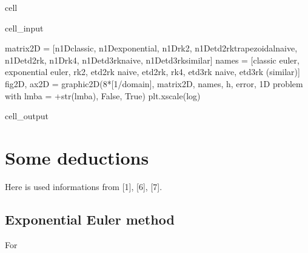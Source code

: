 \documentclass[letterpaper,10pt,english]{jupyterBook}
\begin{document}
\begin{sphinxuseclass}{cell}\begin{sphinxVerbatimInput}

\begin{sphinxuseclass}{cell_input}
\begin{sphinxVerbatim}[commandchars=\\\{\}]
matrix\PYGZus{}2D = [n\PYGZus{}1D\PYGZus{}classic, n\PYGZus{}1D\PYGZus{}exponential, n\PYGZus{}1D\PYGZus{}rk2, n\PYGZus{}1D\PYGZus{}etd2rk\PYGZus{}trapezoidal\PYGZus{}naive, n\PYGZus{}1D\PYGZus{}etd2rk, n\PYGZus{}1D\PYGZus{}rk4, n\PYGZus{}1D\PYGZus{}etd3rk\PYGZus{}naive, n\PYGZus{}1D\PYGZus{}etd3rk\PYGZus{}similar]
names = [\PYGZsq{}classic euler\PYGZsq{}, \PYGZsq{}exponential euler\PYGZsq{}, \PYGZsq{}rk2\PYGZsq{}, \PYGZsq{}etd2rk naive\PYGZsq{}, \PYGZsq{}etd2rk\PYGZsq{}, \PYGZsq{}rk4\PYGZsq{}, \PYGZsq{}etd3rk naive\PYGZsq{}, \PYGZdq{}etd3rk (similar)\PYGZdq{}]
fig\PYGZus{}2D, ax\PYGZus{}2D = graphic\PYGZus{}2D(8*[1/domain], matrix\PYGZus{}2D, names, \PYGZdq{}h\PYGZdq{}, \PYGZdq{}error\PYGZdq{}, \PYGZdq{}1D problem with lmba = \PYGZdq{}+str(lmba), False, True)
plt.xscale(\PYGZsq{}log\PYGZsq{})
\end{sphinxVerbatim}

\end{sphinxuseclass}\end{sphinxVerbatimInput}
\begin{sphinxVerbatimOutput}

\begin{sphinxuseclass}{cell_output}
\noindent{}

\end{sphinxuseclass}\end{sphinxVerbatimOutput}

\end{sphinxuseclass}

\section{Some deductions}
\label{\detokenize{appendix:some-deductions}}
\sphinxAtStartPar
Here is used informations from {[}1{]}, {[}6{]}, {[}7{]}.


\subsection{Exponential Euler method}
\label{\detokenize{appendix:exponential-euler-method}}
\sphinxAtStartPar
For
\end{document}
